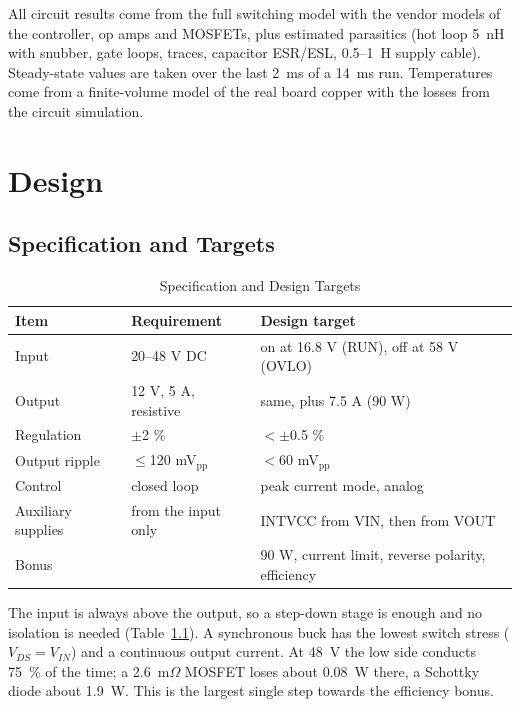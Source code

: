 \documentclass[12pt, a4paper]{report}
\begin{document}
All circuit results come from the full switching model with the vendor models of the controller, op amps and MOSFETs, plus estimated parasitics (hot loop 5~nH with snubber, gate loops, traces, capacitor ESR/ESL, 0.5--1~\textmu H supply cable). Steady-state values are taken over the last 2~ms of a 14~ms run. Temperatures come from a finite-volume model of the real board copper with the losses from the circuit simulation.

\chapter{Design}\label{ch:design}

\section{Specification and Targets}

\begin{table}[H]\centering\caption{Specification and Design Targets}\label{tab:spec}\small
\begin{tabular}{lll}\toprule
Item & Requirement & Design target \\\midrule
Input & 20--48 V DC & on at 16.8 V (RUN), off at 58 V (OVLO) \\
Output & 12 V, 5 A, resistive & same, plus 7.5 A (90 W) \\
Regulation & \(\pm\)2 \% & \(<\pm\)0.5 \% \\
Output ripple & \(\le\)120 mV\(_\text{pp}\) & \(<\)60 mV\(_\text{pp}\) \\
Control & closed loop & peak current mode, analog \\
Auxiliary supplies & from the input only & INTVCC from VIN, then from VOUT \\
Bonus & & 90 W, current limit, reverse polarity, efficiency \\\bottomrule
\end{tabular}\end{table}

The input is always above the output, so a step-down stage is enough and no isolation is needed (Table~\ref{tab:spec}). A synchronous buck has the lowest switch stress (\(V_{DS}=V_{IN}\)) and a continuous output current. At 48~V the low side conducts 75~\% of the time; a 2.6~m\(\Omega\) MOSFET loses about 0.08~W there, a Schottky diode about 1.9~W. This is the largest single step towards the efficiency bonus.
\end{document}
